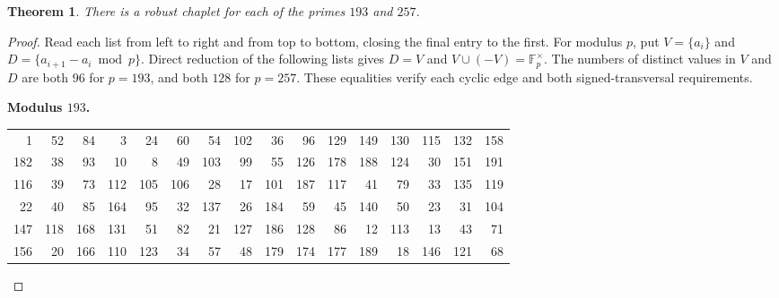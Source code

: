 \documentclass[11pt,a4paper]{article}
\newtheorem{theorem}{Theorem}[section]
\begin{document}
\begin{theorem}\label{thm:robust-certs}
There is a robust chaplet for each of the primes $193$ and $257$.
\end{theorem}

\begin{proof}
Read each list from left to right and from top to bottom, closing the final entry to the first. For modulus $p$, put $V=\{a_i\}$ and $D=\{a_{i+1}-a_i\bmod p\}$. Direct reduction of the following lists gives $D=V$ and $V\cup(-V)=\mathbb F_p^\times$. The numbers of distinct values in $V$ and $D$ are both $96$ for $p=193$, and both $128$ for $p=257$. These equalities verify each cyclic edge and both signed-transversal requirements.

\par\noindent\begin{minipage}{\linewidth}
\noindent\textbf{Modulus $193$.}\par\smallskip
{\small\setlength{\tabcolsep}{3pt}\centering
\begin{tabular}{*{16}{r}}
1 & 52 & 84 & 3 & 24 & 60 & 54 & 102 & 36 & 96 & 129 & 149 & 130 & 115 & 132 & 158 \\
182 & 38 & 93 & 10 & 8 & 49 & 103 & 99 & 55 & 126 & 178 & 188 & 124 & 30 & 151 & 191 \\
116 & 39 & 73 & 112 & 105 & 106 & 28 & 17 & 101 & 187 & 117 & 41 & 79 & 33 & 135 & 119 \\
22 & 40 & 85 & 164 & 95 & 32 & 137 & 26 & 184 & 59 & 45 & 140 & 50 & 23 & 31 & 104 \\
147 & 118 & 168 & 131 & 51 & 82 & 21 & 127 & 186 & 128 & 86 & 12 & 113 & 13 & 43 & 71 \\
156 & 20 & 166 & 110 & 123 & 34 & 57 & 48 & 179 & 174 & 177 & 189 & 18 & 146 & 121 & 68 \\
\end{tabular}\par}
\end{minipage}\par


\end{proof}
\end{document}
